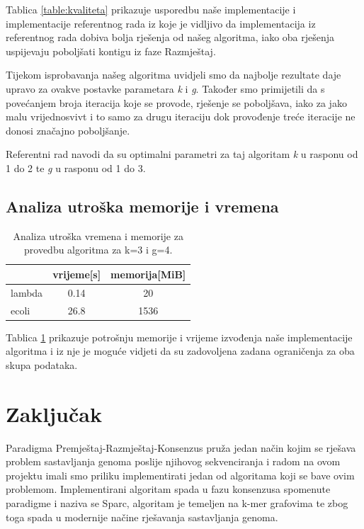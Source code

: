 \documentclass[times, utf8, seminar, numeric]{fer}
\begin{document}
Tablica \ref{table:kvaliteta} prikazuje usporedbu naše implementacije i implementacije referentnog rada iz koje je vidljivo da implementacija iz referentnog rada dobiva bolja rješenja od našeg algoritma, iako oba rješenja uspijevaju poboljšati kontigu iz faze Razmještaj.

Tijekom isprobavanja našeg algoritma uvidjeli smo da najbolje rezultate daje upravo za ovakve postavke parametara \emph{k} i \emph{g}. Također smo primijetili da s povećanjem broja iteracija koje se provode, rješenje se poboljšava, iako za jako malu vrijednosvivt i to samo za drugu iteraciju dok provođenje treće iteracije ne donosi značajno poboljšanje.

Referentni rad navodi da su optimalni parametri za taj algoritam \emph{k} u rasponu od 1 do 2 te \emph{g} u rasponu od 1 do 3. 

\section{Analiza utroška memorije i vremena}
\begin{table}[htb]
	\centering
	\begin{tabular}{l|cc}
		& \multicolumn{1}{l}{vrijeme[s]} & memorija[MiB] \\ 	\hline
		lambda			& 0.14		& 20 	\\ 	\hline
		ecoli  			& 26.8     & 1536  \\	\hline
	\end{tabular}
	\caption{Analiza utroška vremena i memorije za provedbu algoritma za k=3 i g=4.}
	\label{table:memorija}
\end{table}

Tablica \ref{table:memorija} prikazuje potrošnju memorije i vrijeme izvođenja naše implementacije algoritma i iz nje je moguće vidjeti da su zadovoljena zadana ograničenja za oba skupa podataka. 


\chapter{Zaključak}
Paradigma Premještaj-Razmještaj-Konsenzus pruža jedan način kojim se rješava problem sastavljanja genoma poslije njihovog sekvenciranja i radom na ovom projektu imali smo priliku implementirati jedan od algoritama koji se bave ovim problemom. Implementirani algoritam spada u fazu konsenzusa spomenute paradigme i naziva se Sparc, algoritam je temeljen na k-mer grafovima te zbog toga spada u modernije načine rješavanja sastavljanja genoma.
\end{document}
